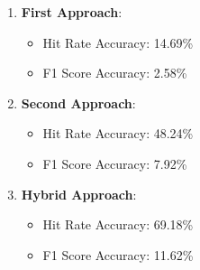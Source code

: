 \begin{enumerate}
    \item \textbf{First Approach}:
    \begin{itemize}
        \item Hit Rate Accuracy: 14.69\%
        \item F1 Score Accuracy: 2.58\%
    \end{itemize}
    \item \textbf{Second Approach}:
    \begin{itemize}
        \item Hit Rate Accuracy: 48.24\%
        \item F1 Score Accuracy: 7.92\%
    \end{itemize}
    \item \textbf{Hybrid Approach}:
    \begin{itemize}
        \item Hit Rate Accuracy: 69.18\%
        \item F1 Score Accuracy: 11.62\%
    \end{itemize}
\end{enumerate}